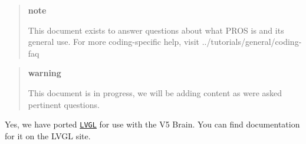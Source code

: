 \begin{quote}
{\bfseries note}

This document exists to answer questions about what P\+R\+OS is and its general use. For more coding-\/specific help, visit ../tutorials/general/coding-\/faq \end{quote}


\begin{quote}
{\bfseries warning}

This document is in progress, we will be adding content as we\textquotesingle{}re asked pertinent questions. \end{quote}


Yes, we have ported \href{https://littlevgl.com/}{\tt L\+V\+GL} for use with the V5 Brain. You can find documentation for it on the L\+V\+GL site. 